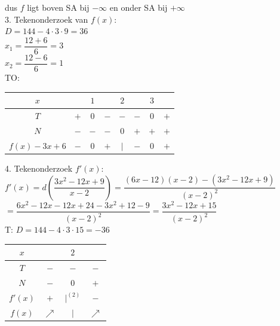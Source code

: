 \documentclass[a4paper]{article}
\begin{document}
\medskip

dus $f$ ligt boven SA bij $-\infty$ en onder SA bij $+\infty$\\

3. Tekenonderzoek van $f(x)$:\\

$D = 144 - 4 \cdot 3 \cdot 9 = 36$\\

$x_1 = \dfrac{12 + 6}{6} = 3$\\

$x_2 = \dfrac{12 - 6}{6} = 1$\\

TO:\\

\begin{tabular}{c | c c c c c c c}
    $x$             &       & $1$   &       & $2$   &       & $3$   & \\ \hline
    $T$             & $+$   & $0$   & $-$   & $-$   & $-$   & $0$   & $+$ \\
    $N$             & $-$   & $-$   & $-$   & $0$   & $+$   & $+$   & $+$ \\ \hline
    $f(x) - 3x + 6$ & $-$   & $0$   & $+$   & $|$   & $-$   & $0$   & $+$\\
\end{tabular}

\bigskip

4. Tekenonderzoek $f'(x)$:\\

$f'(x) = d \left( \dfrac{3x^2 - 12x + 9}{x - 2} \right) = \dfrac{(6x-12)(x-2) - (3x^2 - 12x + 9)}{(x-2)^2}$\\

$ = \dfrac{6x^2 - 12x - 12x + 24 - 3x^2 + 12 - 9}{(x-2)^2} = \dfrac{3x^2 - 12x + 15}{(x-2)^2}$\\

T:
$D = 144 - 4 \cdot 3 \cdot 15 = -36$\\

\begin{tabular}{c | c c c}
    $x$     &       & $2$   & \\ \hline
    $T$     & $-$   & $-$   & $-$ \\
    $N$     & $-$   & $0$   & $+$ \\ \hline
    $f'(x)$ & $+$   & $|^{(2)}$   & $-$ \\ \hline
    $f(x)$  & $\nearrow$ & $|$   & $\nearrow$\\
\end{tabular}
\end{document}

